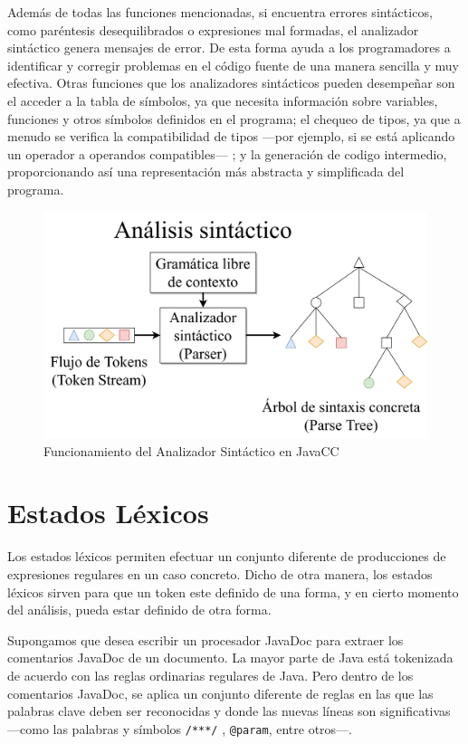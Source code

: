Además de todas las funciones mencionadas, si encuentra errores sintácticos, como paréntesis desequilibrados o expresiones mal formadas, el analizador sintáctico genera mensajes de error\cite{traductorescompiladoreseinterpretes}. De esta forma ayuda a los programadores a identificar y corregir problemas en el código fuente de una manera sencilla y muy efectiva. Otras funciones que los analizadores sintácticos pueden desempeñar son el acceder a la tabla de símbolos, ya que necesita información sobre variables, funciones y otros símbolos definidos en el programa; el chequeo de tipos, ya que a menudo se verifica la compatibilidad de tipos ---por ejemplo, si se está aplicando un operador a operandos compatibles--- ; y la generación de codigo intermedio, proporcionando así una representación más abstracta y simplificada del programa.

\begin{figure}[H]
\centering
\includegraphics[width=\textwidth]{imagenes/analizadorsintactico.png}
\caption{\label{fig:analizadorsintactico}Funcionamiento del Analizador Sintáctico en JavaCC\cite{ytanalizadorsintactico}}
\end{figure}



\section{Estados Léxicos}
Los estados léxicos permiten efectuar un conjunto diferente de producciones de expresiones regulares en un caso concreto. Dicho de otra manera, los estados léxicos sirven para que un token este definido de una forma, y en cierto momento del análisis, pueda estar definido de otra forma.   

Supongamos que desea escribir un procesador JavaDoc para extraer los comentarios JavaDoc de un documento. La mayor parte de Java está tokenizada de acuerdo con las reglas ordinarias regulares de Java. Pero dentro de los comentarios JavaDoc, se aplica un conjunto diferente de reglas en las que las palabras clave deben ser reconocidas y donde las nuevas líneas son significativas ---como las palabras y símbolos \lstinline|/***/| , \lstinline|@param|, entre otros---.

